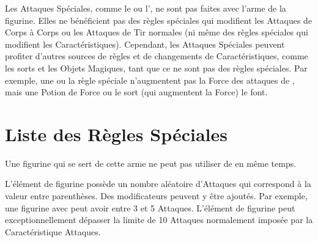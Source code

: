 Les Attaques Spéciales, comme le \stomp{} ou l'\breathweapon{}, ne sont pas faites avec l'arme de la figurine. Elles ne bénéficient pas des règles spéciales qui modifient les Attaques de Corps à Corps ou les Attaques de Tir normales (ni même des règles spéciales qui modifient les Caractéristiques). Cependant, les Attaques Spéciales peuvent profiter d'autres sources de règles et de changements de Caractéristiques, comme les sorts et les Objets Magiques, tant que ce ne sont pas des règles spéciales. Par exemple, une \gw{} ou la règle spéciale \thunderouscharge{} n'augmentent pas la Force des attaques de \stomp{}, mais une Potion de Force ou le sort \og \shamanismspellzero{} \fg{} (qui augmentent la Force) le font.

\vspace*{20pt}
\begin{framed}
\vspace*{-10pt}
\setlength\columnseprule{0.5pt}
\begin{multicols}{3}\raggedcolumns
\noindent\hyperlink{grindingattacks}{\grindingattacks{}}\newline
\hyperlink{crushattack}{\crushattack}\newline
\hyperlink{sweepingattack}{\sweepingattack}\newline
\hyperlink{breathweapon}{\breathweapon{}}\newline
\hyperlink{stomp}{\stomp{}}\newline
\hyperlink{impacthits}{\impacthits{}}
\end{multicols}
\setlength\columnseprule{0pt}
\vspace*{-10pt}
\end{framed}

\newpage
\section{Liste des Règles Spéciales} 


Une figurine qui se sert de cette arme ne peut pas utiliser de \shield{} en même temps.


L'élément de figurine possède un nombre aléatoire d'Attaques qui correspond à la valeur entre parenthèses. Des modificateurs peuvent y être ajoutés. Par exemple, une figurine avec  peut avoir entre 3 et 5 Attaques. L'élément de figurine peut exceptionnellement dépasser la limite de 10 Attaques normalement imposée par la Caractéristique Attaques.

